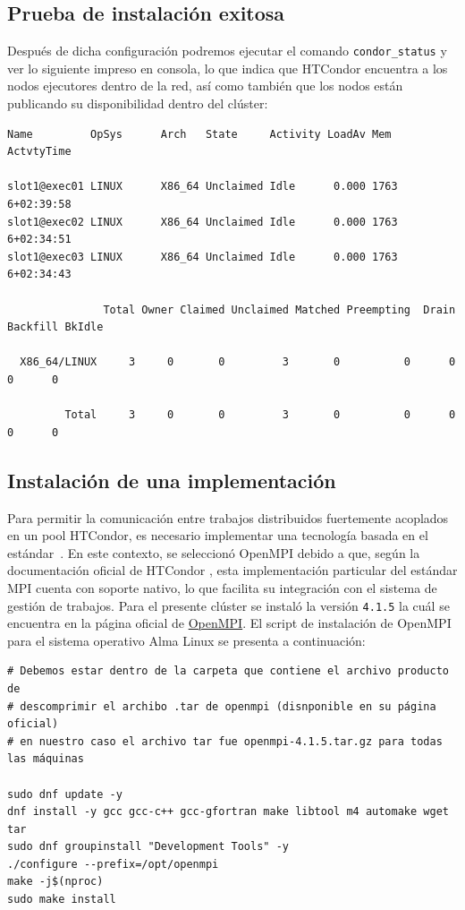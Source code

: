 \FloatBarrier\subsection{Prueba de instalación exitosa}

Después de dicha configuración podremos ejecutar el comando \texttt{condor\_status} y ver lo siguiente impreso en consola, lo que indica que HTCondor encuentra a los nodos ejecutores dentro de la red, así como también que los nodos están publicando su disponibilidad dentro del clúster:

\begin{verbatim}
Name         OpSys      Arch   State     Activity LoadAv Mem   ActvtyTime

slot1@exec01 LINUX      X86_64 Unclaimed Idle      0.000 1763  6+02:39:58
slot1@exec02 LINUX      X86_64 Unclaimed Idle      0.000 1763  6+02:34:51
slot1@exec03 LINUX      X86_64 Unclaimed Idle      0.000 1763  6+02:34:43

               Total Owner Claimed Unclaimed Matched Preempting  Drain Backfill BkIdle

  X86_64/LINUX     3     0       0         3       0          0      0        0      0

         Total     3     0       0         3       0          0      0        0      0
\end{verbatim}


\FloatBarrier\subsection{Instalación de una implementación \MPI}

Para permitir la comunicación entre trabajos distribuidos fuertemente acoplados en un pool HTCondor, es necesario implementar una tecnología basada en el estándar~\MPI. En este contexto, se seleccionó OpenMPI debido a que, según la documentación oficial de HTCondor \cite{HTCondor_Parallel}, esta implementación particular del estándar MPI cuenta con soporte nativo, lo que facilita su integración con el sistema de gestión de trabajos. Para el presente clúster se instaló la versión \texttt{4.1.5} la cuál se encuentra en la página oficial de \href{https://www.open-mpi.org/software/ompi/v4.1/}{OpenMPI}. El script de instalación de OpenMPI para el sistema operativo Alma Linux se presenta a continuación:

\begin{verbatim}
# Debemos estar dentro de la carpeta que contiene el archivo producto de 
# descomprimir el archibo .tar de openmpi (disnponible en su página oficial)
# en nuestro caso el archivo tar fue openmpi-4.1.5.tar.gz para todas las máquinas

sudo dnf update -y
dnf install -y gcc gcc-c++ gcc-gfortran make libtool m4 automake wget tar
sudo dnf groupinstall "Development Tools" -y
./configure --prefix=/opt/openmpi
make -j$(nproc)
sudo make install
\end{verbatim}


